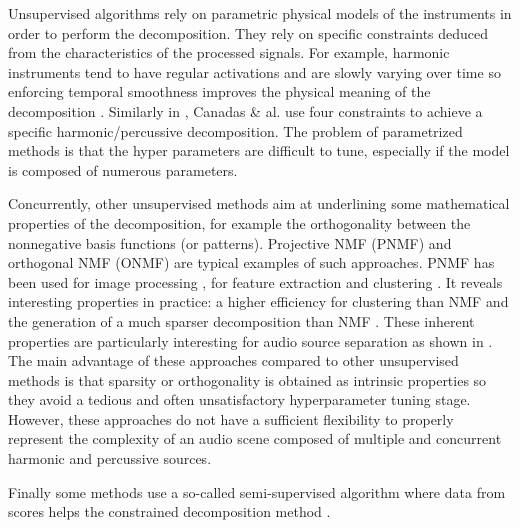 \documentclass[journal]{IEEEtran}
\begin{document}
Unsupervised algorithms rely on parametric physical models of the instruments in order to perform the decomposition. They rely on specific constraints deduced from the characteristics of the processed signals. For example, harmonic instruments tend to have regular activations and are slowly varying over time so enforcing temporal smoothness improves the physical meaning of the decomposition \cite{Virtanen}. Similarly in \cite{canadas2014percussive}, Canadas \& al. use four constraints to achieve a specific harmonic/percussive decomposition. The problem of parametrized methods is that the hyper parameters are difficult to tune, especially if the model is composed of numerous parameters. 

Concurrently, other unsupervised methods aim at underlining some mathematical properties of the decomposition, for example the orthogonality between the nonnegative basis functions (or patterns). Projective NMF (PNMF) and orthogonal NMF (ONMF) are typical examples of such approaches. PNMF has been used for image processing \cite{choi}, for feature extraction and clustering \cite{YangOja10}. It reveals interesting properties in practice: a higher efficiency for clustering than NMF \cite{choi} and the generation of a much sparser decomposition than NMF \cite{YangOja10}. These inherent properties are particularly interesting for audio source separation as shown in \cite{canadas2014percussive,vincent2010adaptive}. 
The main advantage of these approaches compared to other unsupervised methods is that sparsity or orthogonality is obtained as intrinsic properties so they avoid a tedious and often unsatisfactory hyperparameter tuning stage. However, these approaches do not have a sufficient flexibility to properly represent the complexity of an audio scene composed of multiple and concurrent harmonic and percussive sources.


Finally some methods use a so-called semi-supervised algorithm where data from scores helps the constrained decomposition method \cite{hennequin2011score,fritsch2013score}.
\end{document}
